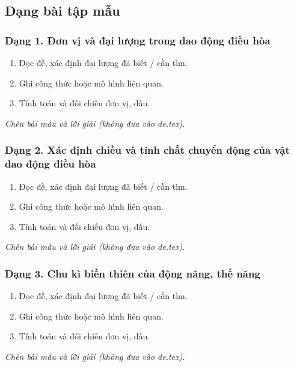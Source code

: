 

\subsection{Dạng bài tập mẫu}
\subsubsection{Dạng 1. Đơn vị và đại lượng trong dao động điều hòa}
\begin{phuongphap}
\begin{enumerate}
\item Đọc đề, xác định đại lượng đã biết / cần tìm.
\item Ghi công thức hoặc mô hình liên quan.
\item Tính toán và đối chiếu đơn vị, dấu.
\end{enumerate}
\end{phuongphap}
\begin{vidumau}
\textit{Chèn bài mẫu và lời giải (không đưa vào de.tex).}
\end{vidumau}

\subsubsection{Dạng 2. Xác định chiều và tính chất chuyển động của vật dao động điều hòa}
\begin{phuongphap}
\begin{enumerate}
\item Đọc đề, xác định đại lượng đã biết / cần tìm.
\item Ghi công thức hoặc mô hình liên quan.
\item Tính toán và đối chiếu đơn vị, dấu.
\end{enumerate}
\end{phuongphap}
\begin{vidumau}
\textit{Chèn bài mẫu và lời giải (không đưa vào de.tex).}
\end{vidumau}

\subsubsection{Dạng 3. Chu kì biến thiên của động năng, thế năng}
\begin{phuongphap}
\begin{enumerate}
\item Đọc đề, xác định đại lượng đã biết / cần tìm.
\item Ghi công thức hoặc mô hình liên quan.
\item Tính toán và đối chiếu đơn vị, dấu.
\end{enumerate}
\end{phuongphap}
\begin{vidumau}
\textit{Chèn bài mẫu và lời giải (không đưa vào de.tex).}
\end{vidumau}

